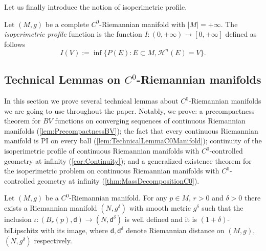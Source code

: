 \documentclass[a4paper,12pt,reqno]{amsart}
\numberwithin{equation}{section}
\theoremstyle{plain}
\theoremstyle{definition}
\theoremstyle{remark}
\newcommand{\dist}{\mathsf{d}}
\begin{document}
{Let us finally introduce the notion of isoperimetric profile.
\begin{definition}
    Let $(M,g)$ be a complete $C^0$-Riemannian manifold with $|M|=+\infty$. The \textit{isoperimetric profile} function is the function $I:(0,+\infty)\to [0,+\infty]$ defined as follows
    \[
    I(V):=\inf\{P(E):E\subset M,\mathcal{H}^n(E)=V\}.
    \]
\end{definition}

\subsection{Technical Lemmas on $C^0$-Riemannian manifolds}

In this section we prove several technical lemmas about $C^0$-Riemannian manifolds we are going to use throughout the paper. Notably, we prove: a precompactness theorem for $BV$ functions on converging sequences of continuous Riemannian manifolds (\cref{lem:PrecompactnessBV}); the fact that every continuous Riemannian manifold is PI on every ball (\cref{lem:TechnicalLemmaC0Manifold}); continuity of the isoperimetric profile of continuous Riemannian manifolds with $C^0$-controlled geometry at infinity (\cref{cor:Continuity}); and a generalized existence theorem for the isoperimetric problem on continuous Riemannian manifolds with $C^0$-controlled geometry at infinity (\cref{thm:MassDecompositionC0}).
\begin{lemma}\label{lem:ApprossimazioneC0Bilipschitz}
    Let $(M,g)$ be a $C^0$-Riemannian manifold. For any $p \in M$, $r>0$ and $\delta>0$ there exists a Riemannian manifold $(N,g^\delta)$ with smooth metric $g^\delta$ such that the inclusion $\iota: (B_r(p), \dist) \to (N, \dist^\delta)$ is well defined and it is $(1+\delta)$-biLipschitz with its image, where $\dist, \dist^\delta$ denote Riemannian distance on $(M,g)$, $(N,g^\delta)$ respectively.
\end{lemma}

}
\end{document}
